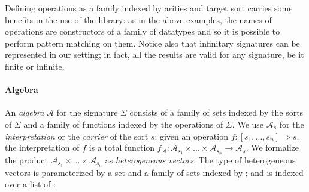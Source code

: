 \noindent Defining operations as a family indexed by arities and
target sort carries some benefits in the use of the library: as in
the above examples, the names of operations are constructors of a
family of datatypes and so it is possible to perform pattern matching
on them. Notice also that infinitary signatures can be represented in
our setting; in fact, all the results are valid for any signature, be
it finite or infinite.

\paragraph*{Algebra}
An \emph{algebra} $\mathcal{A}$ for the signature $\Sigma$ consists of
a family of sets indexed by the sorts of $\Sigma$ and a family of
functions indexed by the operations of $\Sigma$. We use
$\mathcal{A}_s$ for the \emph{interpretation} or the \emph{carrier} of
the sort $s$; given an operation
$f \colon [s_1,...,s_n] \Rightarrow s$, the interpretation of $f$ is a
total function
$f_{\mathcal{A}}\colon \mathcal{A}_{s_1} \times ... \times
\mathcal{A}_{s_n} \rightarrow \mathcal{A}_s$.
We formalize the product $\mathcal{A}_{s_1} \times ... \times
\mathcal{A}_{s_n}$ as \emph{heterogeneous vectors}. The
type of heterogeneous vectors is parameterized by a set 
and a family of sets indexed by ; and is indexed over a
list of :

\begin{code}
\>[0]\AgdaSpace{}%
\AgdaSpace{}%
\AgdaSymbol{\{}\AgdaSymbol{\}}\AgdaSpace{}%
\AgdaSymbol{\{}\AgdaSpace{}%
\AgdaSymbol{:}\AgdaSpace{}%
\AgdaSymbol{\}}\AgdaSpace{}%
\AgdaSymbol{(}\AgdaSpace{}%
\AgdaSymbol{:}\AgdaSpace{}%
\AgdaSpace{}%
\AgdaSpace{}%
\AgdaSpace{}%
\AgdaSymbol{)}\AgdaSpace{}%
\AgdaSymbol{:}\AgdaSpace{}%
\AgdaSpace{}%
\AgdaSpace{}%
\AgdaSpace{}%
\AgdaSpace{}%
\AgdaSpace{}%
\<%
\\
\>[0][@{}l@{\AgdaIndent{0}}]%
\>[2]%
\>[6]\AgdaSymbol{:}\AgdaSpace{}%
\AgdaSpace{}%
\AgdaSpace{}%
\AgdaInductiveConstructor{[]}\<%
\\
%
\>[2]\AgdaSpace{}%
\AgdaSymbol{:}\AgdaSpace{}%
\AgdaSpace{}%
\AgdaSymbol{\{}\AgdaSpace{}%
\AgdaSymbol{\}}\AgdaSpace{}%
\AgdaSpace{}%
\AgdaSymbol{(}\AgdaSpace{}%
\AgdaSymbol{:}\AgdaSpace{}%
\AgdaSpace{}%
\AgdaSymbol{)}\AgdaSpace{}%
\AgdaSpace{}%
\AgdaSymbol{(}\AgdaSpace{}%
\AgdaSymbol{:}\AgdaSpace{}%
\AgdaSpace{}%
\AgdaSpace{}%
\AgdaSymbol{)}\AgdaSpace{}%
\AgdaSpace{}%
\AgdaSpace{}%
\AgdaSpace{}%
\AgdaSymbol{(}\AgdaSpace{}%
\AgdaSpace{}%
\AgdaSymbol{)}\<%
\end{code}


